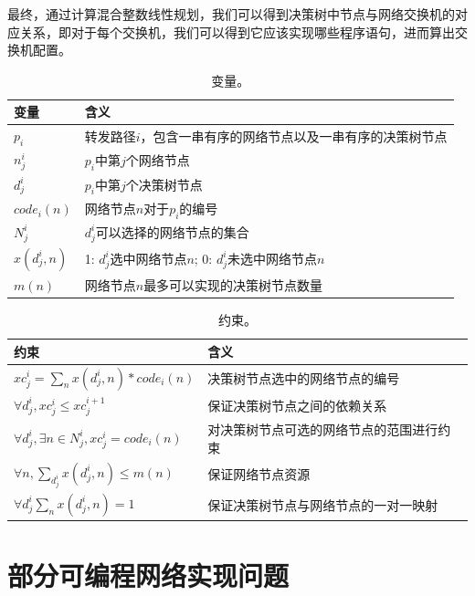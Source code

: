 最终，通过计算混合整数线性规划，我们可以得到决策树中节点与网络交换机的对应关系，即对于每个交换机，我们可以得到它应该实现哪些程序语句，进而算出交换机配置。

\begin{table}[]
\begin{tabular}{l|l}
变量     & 含义                                                             \\ \hline
$p_i$ & 转发路径$i$，包含一串有序的网络节点以及一串有序的决策树节点                            \\ 
$n_j^i$          &  $p_i$中第$j$个网络节点                      \\
$d_j^i$        & $p_i$中第$j$个决策树节点                                            \\
$code_i(n)$        &  网络节点$n$对于$p_i$的编号\\
$N_j^i$     &  $d_j^i$可以选择的网络节点的集合\\
$x(d_j^i, n)$      &  1: $d_j^i$选中网络节点$n$; 0: $d_j^i$未选中网络节点$n$\\
$m(n)$              & 网络节点$n$最多可以实现的决策树节点数量              
\end{tabular}
\caption{\small 变量。}
\label{table:variables}
\end{table}

\begin{table}[]
\begin{tabular}{l|l}
约束                                        & 含义                               \\ \hline
$xc_j^i = \sum_n x(d_j^i, n)*code_i(n)$          & 决策树节点选中的网络节点的编号   \\
$\forall d_j^i, xc_j^i \leq xc_j^{i+1}$                    & 保证决策树节点之间的依赖关系                  \\
$\forall d_j^i, \exists n \in N_j^i, xc_j^i = code_i(n)$      & 对决策树节点可选的网络节点的范围进行约束     \\
$\forall n, \sum_{d_j^i} x(d_j^i, n) \leq m(n)$   & 保证网络节点资源 \\
$\forall d_j^i \sum_n x(d_j^i, n) = 1$  & 保证决策树节点与网络节点的一对一映射
\end{tabular}
\caption{\small 约束。}
\label{table:constraints}
\end{table}


\section{部分可编程网络实现问题}

